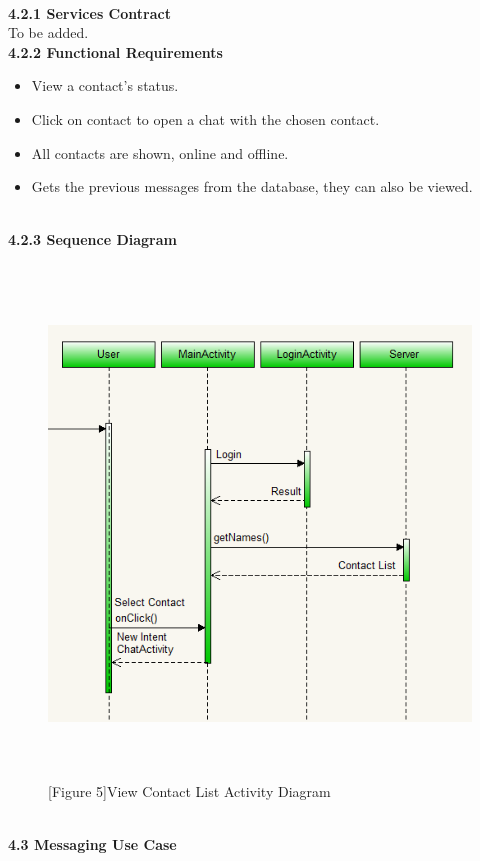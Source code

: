 \documentclass[29pt,a4paper]{moderncv}
\begin{document}
		\\ \noindent\textbf{4.2.1 Services Contract}\\
		To be added.\\
		
		\noindent\textbf{4.2.2 Functional Requirements}
			\begin{itemize}
				\item View a contact’s status.
				\item Click on contact to open a chat with the chosen contact.
				\item All contacts are shown, online and offline.
				\item Gets the previous messages from the database, they can also be viewed.\\
			\end{itemize}
\newpage
		\\ \left\textbf{4.2.3 Sequence Diagram} \\
			\begin{figure}
				\centering
				 \\ \includegraphics[width=5.5in, height=5.0in]{./viewContactsActivity.png}
				\\\caption{[Figure 5]View Contact List Activity Diagram}
			\end{figure}	
\newpage
	\\ \left\textbf{4.3 Messaging Use Case} \\
\end{document}
